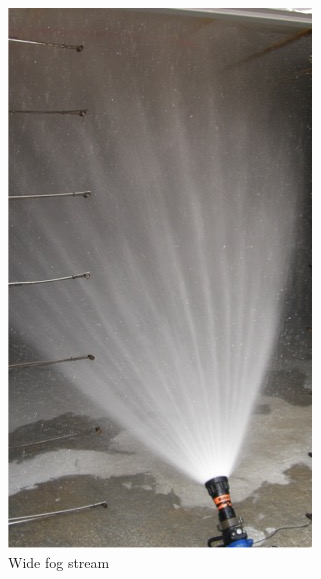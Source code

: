 \documentclass[12pt,oneside]{book}
\begin{document}
\begin{figure}[!ht]
\begin{subfigure}[b]{0.45\columnwidth}
		\includegraphics[width=0.75\columnwidth]{../Figures/Pictures/WF_example}
		\caption{Wide fog stream}
	\end{subfigure}
	\\~\\
	\begin{subfigure}[b]{0.45\columnwidth}
		\centering

\end{subfigure}
\end{figure}
\end{document}
